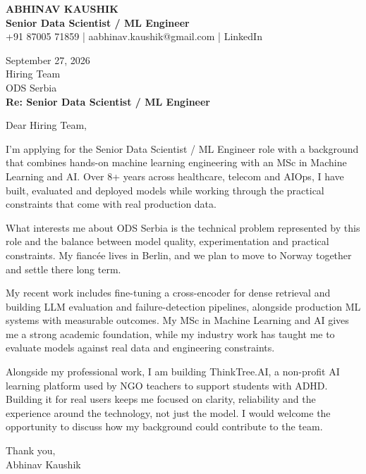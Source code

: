 \documentclass[10pt,a4paper]{article}
\begin{document}
\begin{center}
{\Large\bfseries ABHINAV KAUSHIK}\\[2pt]
{\bfseries Senior Data Scientist / ML Engineer}\\[2pt]
+91 87005 71859 \quad | \quad aabhinav.kaushik@gmail.com \quad | \quad LinkedIn
\end{center}
\vspace{8pt}
September 27, 2026\\[6pt]
Hiring Team\\
ODS Serbia\\[4pt]
\textbf{Re: Senior Data Scientist / ML Engineer}

Dear Hiring Team,

I’m applying for the Senior Data Scientist / ML Engineer role with a background that combines hands-on machine learning engineering with an MSc in Machine Learning and AI. Over 8+ years across healthcare, telecom and AIOps, I have built, evaluated and deployed models while working through the practical constraints that come with real production data.

What interests me about ODS Serbia is the technical problem represented by this role and the balance between model quality, experimentation and practical constraints. My fiancée lives in Berlin, and we plan to move to Norway together and settle there long term.

My recent work includes fine-tuning a cross-encoder for dense retrieval and building LLM evaluation and failure-detection pipelines, alongside production ML systems with measurable outcomes. My MSc in Machine Learning and AI gives me a strong academic foundation, while my industry work has taught me to evaluate models against real data and engineering constraints.

Alongside my professional work, I am building ThinkTree.AI, a non-profit AI learning platform used by NGO teachers to support students with ADHD. Building it for real users keeps me focused on clarity, reliability and the experience around the technology, not just the model. I would welcome the opportunity to discuss how my background could contribute to the team.

Thank you,\\
Abhinav Kaushik
\end{document}
